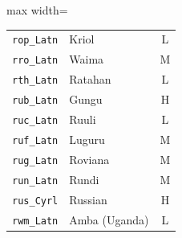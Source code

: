 {\begin{adjustbox}{max width=\textwidth}
\begin{tabular}{llc}
        \texttt{rop\_Latn} & Kriol & L \\
        \texttt{rro\_Latn} & Waima & M \\
        \texttt{rth\_Latn} & Ratahan & L \\
        \texttt{rub\_Latn} & Gungu & H \\
        \texttt{ruc\_Latn} & Ruuli & L \\
        \texttt{ruf\_Latn} & Luguru & M \\
        \texttt{rug\_Latn} & Roviana & M \\
        \texttt{run\_Latn} & Rundi & M \\
        \texttt{rus\_Cyrl} & Russian & H \\
        \texttt{rwm\_Latn} & Amba (Uganda) & L \\
        \bottomrule
    \end{tabular}
    \end{adjustbox}
}

